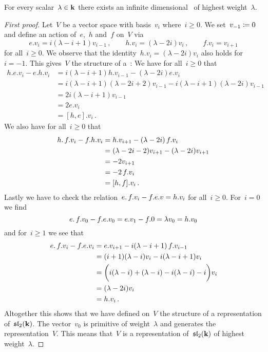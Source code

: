 \begin{lemma}
  \label{existence of highest weight for sl2}
  For every scalar~$\lambda \in \mathbf{k}$ there exists an infinite dimensional~{} of highest weight~$\lambda$.
\end{lemma}


\begin{proof}[First proof]
  Let~$V$ be a vector space with basis~$v_i$ where~$i \geq 0$.
  We set~$v_{-1} \coloneqq 0$ and define an action of~$e$,~$h$ and~$f$ on~$V$ via
  \[
    e.v_i
    =
    i(\lambda-i+1) v_{i-1}  \,,
    \qquad
    h.v_i
    =
    (\lambda-2i) v_i  \,,
    \qquad
    f.v_i
    =
    v_{i+1}
  \]
  for all~$i \geq 0$.
  We observe that the identity~$h.v_i = (\lambda-2i) v_i$ also holds for~$i = -1$.
  This gives~$V$ the structure of a~{}:
  We have for all~$i \geq 0$ that
  \begin{align*}
    h.e.v_i - e.h.v_i
    &=
    i(\lambda-i+1)h.v_{i-1} - (\lambda-2i)e.v_i
    \\
    &=
    i(\lambda-i+1)(\lambda-2i+2) v_{i-1} - i(\lambda-i+1)(\lambda-2i) v_{i-1}
    \\
    &=
    2i(\lambda-i+1) v_{i-1}
    \\
    &=
    2e.v_i
    \\
    &=
    [h,e].v_i \,.
  \end{align*}
  We also have for all~$i \geq 0$ that
  \begin{align*}
    h . \, f . v_i - f.h.v_i
    &=
    h.v_{i+1} - (\lambda-2i) \, f.v_i
    \\
    &=
    (\lambda-2i-2) v_{i+1} - (\lambda-2i) v_{i+1}
    \\
    &=
    -2 v_{i+1}
    \\
    &=
    -2 \, f.v_i
    \\
    &=
    [h,f].v_i \,.
  \end{align*}
  Lastly we have to check the relation~$e . \, f . v_i - f.e.v = h.v_i$ for all~$i \geq 0$.
  For~$i = 0$ we find
  \[
    e . \, f . v_0 - f.e.v_0
    =
    e.v_1 - f.0
    =
    \lambda v_0
    =
    h.v_0
  \]
  and for~$i \geq 1$ we see that
  \begin{align*}
    e . \, f . v_i - f.e.v_i
    &=
    e.v_{i+1} - i(\lambda-i+1) \, f.v_{i-1}
    \\
    &=
    (i+1)(\lambda-i) v_i - i(\lambda-i+1) v_i
    \\
    &=
    \biggl( i(\lambda-i) + (\lambda-i) - i(\lambda-i) - i \biggr) v_i
    \\
    &=
    (\lambda-2i) v_i
    \\
    &=
    h.v_i \,.
  \end{align*}
  Altogether this shows that we have defined on~$V$ the structure of a representation of~$\mathfrak{sl}_2(\mathbf{k})$.
  The vector~$v_0$ is primitive of weight~$\lambda$ and generates the representation~$V$.
  This means that~$V$ is a representation of~$\mathfrak{sl}_2(\mathbf{k})$ of highest weight~$\lambda$.
\end{proof}


